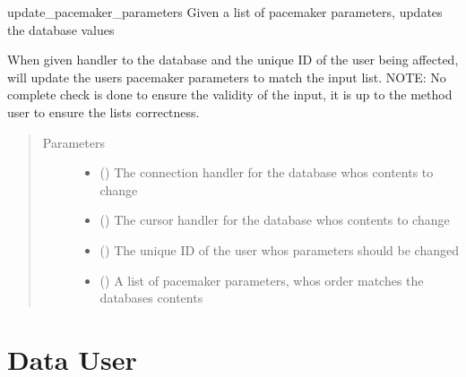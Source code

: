 \documentclass[letterpaper,10pt,english]{sphinxmanual}
\begin{document}
\begin{fulllineitems}
\label{\detokenize{index:data.database.update_pacemaker_parameters}}
update\_pacemaker\_parameters Given a list of pacemaker parameters, updates the database values

When given handler to the database and the unique ID of the user being affected, will update the
users pacemaker parameters to match the input list.
NOTE: No complete check is done to ensure the validity of the input, it is up
to the method user to ensure the lists correctness.
\begin{quote}\begin{description}
\item[{Parameters}] \leavevmode\begin{itemize}
\item {} 
 () \textendash{} The connection handler for the database whos contents to change

\item {} 
 () \textendash{} The cursor handler for the database whos contents to change

\item {} 
 () \textendash{} The unique ID of the user whos parameters should be changed

\item {} 
 () \textendash{} A list of pacemaker parameters, whos order matches the databases contents

\end{itemize}

\end{description}\end{quote}

\end{fulllineitems}



\chapter{Data User}
\label{\detokenize{index:module-data.user}}\label{\detokenize{index:data-user}}
\end{document}

